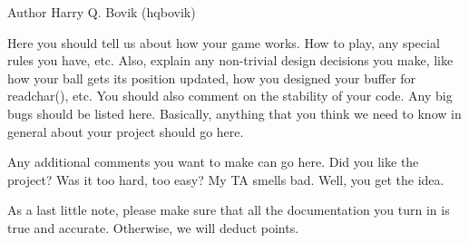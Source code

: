 \begin{DoxyAuthor}{Author}
Harry Q. Bovik (hqbovik)
\end{DoxyAuthor}
Here you should tell us about how your game works. How to play, any special rules you have, etc. Also, explain any non-\/trivial design decisions you make, like how your ball gets its position updated, how you designed your buffer for readchar(), etc. You should also comment on the stability of your code. Any big bugs should be listed here. Basically, anything that you think we need to know in general about your project should go here.

Any additional comments you want to make can go here. Did you like the project? Was it too hard, too easy? My TA smells bad. Well, you get the idea.

As a last little note, please make sure that all the documentation you turn in is true and accurate. Otherwise, we will deduct points. 